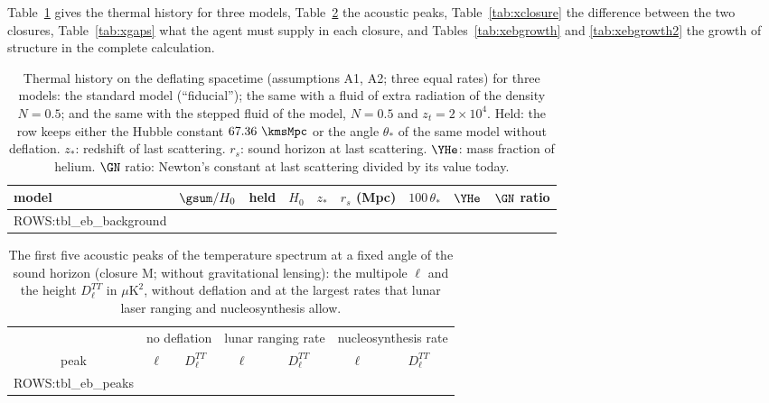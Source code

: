Table~\ref{tab:xbackground} gives the thermal history for three models, Table~\ref{tab:xpeaks} the
acoustic peaks, Table~\ref{tab:xclosure} the difference between the two closures,
Table~\ref{tab:xgaps} what the agent must supply in each closure, and Tables~\ref{tab:xebgrowth} and
\ref{tab:xebgrowth2} the growth of structure in the complete calculation.

\begin{table}
\caption{\label{tab:xbackground}Thermal history on the deflating spacetime (assumptions A1, A2; three
equal rates) for three models: the standard model (``fiducial''); the same with a fluid of extra
radiation of the density $N=0.5$; and the same with the stepped fluid of the model, $N=0.5$ and
$z_t=2\times10^{4}$. Held: the row keeps either the Hubble constant $67.36~\kmsMpc$ or the angle
$\theta_*$ of the same model without deflation. $z_*$: redshift of last scattering. $r_s$: sound
horizon at last scattering. $\YHe$: mass fraction of helium. $\GN$ ratio: Newton's constant at last
scattering divided by its value today.}
\begin{ruledtabular}
\begin{tabular}{lcccccccc}
model & $\gsum/H_0$ & held & $H_0$ & $z_*$ & $r_s$ (Mpc) & $100\,\theta_*$ & $\YHe$ & $\GN$ ratio \\
\hline
{{ROWS:tbl_eb_background}}
\end{tabular}
\end{ruledtabular}
\end{table}

\begin{table}
\caption{\label{tab:xpeaks}The first five acoustic peaks of the temperature spectrum at a fixed angle
of the sound horizon (closure M; without gravitational lensing): the multipole $\ell$ and the height
$D_\ell^{TT}$ in $\mu\mathrm{K}^{2}$, without deflation and at the largest rates that lunar laser
ranging and nucleosynthesis allow.}
\begin{ruledtabular}
\begin{tabular}{ccccccc}
 & \multicolumn{2}{c}{no deflation} & \multicolumn{2}{c}{lunar ranging rate} & \multicolumn{2}{c}{nucleosynthesis rate} \\
peak & $\ell$ & $D_\ell^{TT}$ & $\ell$ & $D_\ell^{TT}$ & $\ell$ & $D_\ell^{TT}$ \\
\hline
{{ROWS:tbl_eb_peaks}}
\end{tabular}
\end{ruledtabular}
\end{table}

